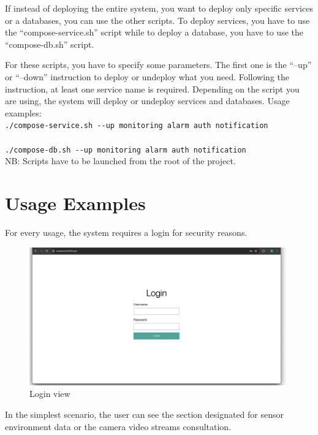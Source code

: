 \documentclass{scrartcl}
\begin{document}
    If instead of deploying the entire system, you want to deploy only specific services or a databases, you can use the other scripts.
    To deploy services, you have to use the ``compose-service.sh'' script while to deploy a database, you have to use the ``compose-db.sh'' script.

    For these scripts, you have to specify some parameters.
    The first one is the ``--up'' or ``--down'' instruction to deploy or undeploy what you need.
    Following the instruction, at least one service name is required.
    Depending on the script you are using, the system will deploy or undeploy services and databases.
    Usage examples:
    \\

    \verb|./compose-service.sh --up monitoring alarm auth notification|
    \\
    \\
    \verb|./compose-db.sh --up monitoring alarm auth notification|
    \\

    NB: Scripts have to be launched from the root of the project.

    \section{Usage Examples}

    For every usage, the system requires a login for security reasons.

    \begin{figure}
        \centering
        \includegraphics[scale=0.25]{img/usage/login_view}
        \caption{Login view}
        \label{fig:login_view}
    \end{figure}

    In the simplest scenario, the user can see the section designated for sensor environment data or the camera video streams consultation.
\end{document}

